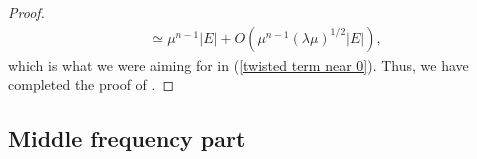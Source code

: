 \documentclass[11pt, reqno]{amsart}
\theoremstyle{plain}
\newcommand{\blue}{\textcolor{blue}}
\theoremstyle{remark}
\newcommand{\red}[1]{\textcolor{red}{#1}}
\theoremstyle{example}
\theoremstyle{definition}
\numberwithin{equation}{section}
\begin{document}
\begin{proof}
\begin{equation*}
\begin{split}
        & \simeq \mu^{n-1} |E| +  O (  \mu^{n-1} (\lambda \mu)^{1/2} |E|),
    \end{split}
\end{equation*}
which is what we were aiming for in (\ref{twisted term near 0}). Thus, we have completed the proof of .
\end{proof}

\subsection{Middle frequency part }
\end{document}
